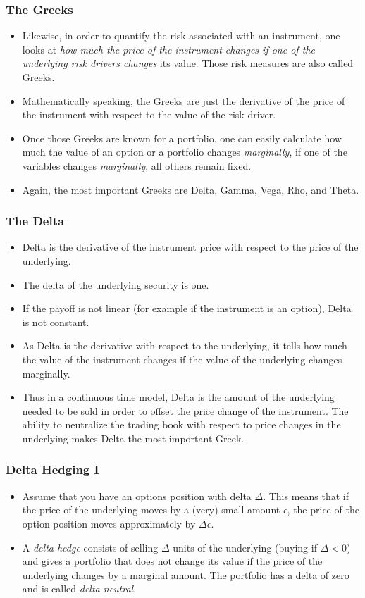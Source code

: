 \begin{frame}[fragile]
\frametitle{The Greeks}
\begin{itemize}
\item Likewise, in order to quantify the risk associated with an instrument, one looks at
\emph{ how much the price of the instrument changes if one of the underlying
risk drivers changes} its value. Those risk measures are also called
Greeks.
\item Mathematically speaking, the Greeks are just the derivative of the price
of the instrument with respect to the value of the risk driver.
\item Once those Greeks are known for a portfolio, one can easily calculate how
much the value of an option or a portfolio changes \emph{marginally}, if one of
the variables changes \emph{marginally}, all others remain fixed.
\item Again, the most important Greeks are Delta, Gamma, Vega, Rho, and Theta.
\end{itemize}
\end{frame}

\begin{frame}[fragile]
\frametitle{The Delta}
\begin{itemize}
\item Delta is the derivative of the instrument price with respect to the price
of the underlying.
\item The delta of the underlying security is one.
\item If the payoff is not linear (for example if the instrument is an option),
Delta is not constant.
\item As Delta is the derivative with respect to the underlying, it tells how
much the value of the instrument changes if the value of the underlying changes
marginally.
\item Thus in a continuous time model, Delta is the amount of the underlying
needed to be sold in order to offset the price change of the instrument. The
ability to neutralize the trading book with respect to price changes in the
underlying makes Delta the most important Greek.
\end{itemize}
\end{frame}

\begin{frame}[fragile]
\frametitle{Delta Hedging I}
\begin{itemize}
  \item Assume that you have an options position with delta $\Delta$. This means
  that if the price of the underlying moves by a (very) small amount $\epsilon$, the
  price of the option position moves approximately by $\Delta \epsilon$.
  \item A \emph{delta hedge} consists of selling $\Delta$ units of the
  underlying (buying if $\Delta <0$) and gives a portfolio that does not
  change its value if the price of the underlying changes by a marginal amount.
  The portfolio has a delta of zero and is called \emph{delta neutral}.
\end{itemize}
\end{frame}

